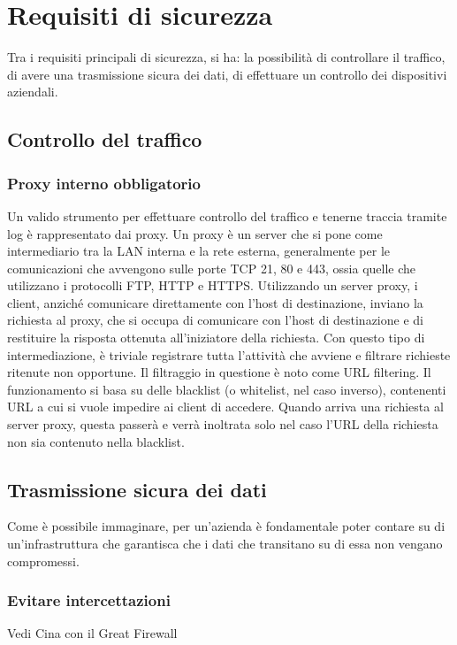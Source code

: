 \section{Requisiti di sicurezza}
Tra i requisiti principali di sicurezza, si ha: la possibilità di controllare il traffico, di avere una trasmissione sicura dei dati, di effettuare un controllo dei dispositivi aziendali.

\subsection{Controllo del traffico}
\subsubsection{Proxy interno obbligatorio}
Un valido strumento per effettuare controllo del traffico e tenerne traccia tramite log è rappresentato dai proxy.
Un proxy è un server che si pone come intermediario tra la LAN interna e la rete esterna, generalmente per le comunicazioni che avvengono sulle porte TCP 21, 80 e 443, ossia quelle che utilizzano i protocolli FTP, HTTP e HTTPS.
Utilizzando un server proxy, i client, anziché comunicare direttamente con l'host di destinazione, inviano la richiesta al proxy, che si occupa di comunicare con l'host di destinazione e di restituire la risposta ottenuta all'iniziatore della richiesta.
Con questo tipo di intermediazione, è triviale registrare tutta l'attività che avviene e filtrare richieste ritenute non opportune.
Il filtraggio in questione è noto come URL filtering. Il funzionamento si basa su delle blacklist (o whitelist, nel caso inverso), contenenti URL a cui si vuole impedire ai client di accedere. Quando arriva una richiesta al server proxy, questa passerà e verrà inoltrata solo nel caso l'URL della richiesta non sia contenuto nella blacklist.

\subsection{Trasmissione sicura dei dati}
Come è possibile immaginare, per un'azienda è fondamentale poter contare su di un'infrastruttura che garantisca che i dati che transitano su di essa non vengano compromessi.

\subsubsection{Evitare intercettazioni}
Vedi Cina con il Great Firewall

